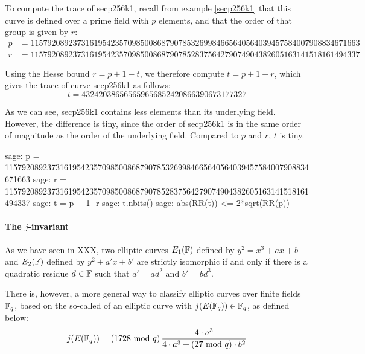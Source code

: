 \begin{example}\label{ex:secp256k1-trace}To compute the trace of secp256k1, recall from example \ref{secp256k1} that this curve is defined over a prime field with $p$ elements, and that the order of that group is given by $r$:  
\begin{align*}
p &= \scriptstyle 115792089237316195423570985008687907853269984665640564039457584007908834671663\\
r &= \scriptstyle 115792089237316195423570985008687907852837564279074904382605163141518161494337
\end{align*}

Using the Hesse bound $r = p + 1 -t$, we therefore compute $t= p+1 -r$, which gives the trace of curve secp256k1 as follows:
$$
t = \scriptstyle 432420386565659656852420866390673177327
$$

As we can see, secp256k1 contains less elements than its underlying field. However,  the difference is tiny, since the order of secp256k1 is in the same order of magnitude as the order of the underlying field. Compared to $p$ and $r$, $t$ is tiny.

\begin{sagecommandline}
sage: p = 115792089237316195423570985008687907853269984665640564039457584007908834671663
sage: r = 115792089237316195423570985008687907852837564279074904382605163141518161494337
sage: t = p + 1 -r
sage: t.nbits()
sage: abs(RR(t)) <= 2*sqrt(RR(p))
\end{sagecommandline}
\end{example} 

\paragraph{The $j$-invariant} As we have seen in XXX, two elliptic curves $E_1(\mathbb{F})$ defined by $y^2 = x^3 + ax +b$ and $E_2(\mathbb{F})$ defined by $y^2 + a'x + b'$ are strictly isomorphic if and only if there is a quadratic residue $d\in \mathbb{F}$ such that $a' = a d^2$ and $b' = b d^3$. 

There is, however, a more general way to classify elliptic curves over finite fields $\mathbb{F}_q$, based on the so-called  of an elliptic curve with $j(E(\mathbb{F}_q))\in\mathbb{F}_q$, as defined below:
\begin{equation}\label{eq:j-invariant1}
j(E(\mathbb{F}_q)) = \left(1728 \text{ mod } q\right) \frac{4\cdot a^3}{4\cdot a^3+ (27 \text{ mod } q)\cdot b^2}
\end{equation}

